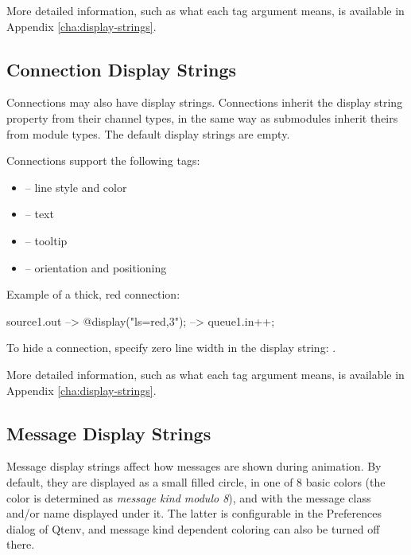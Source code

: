 More detailed information, such as what each tag argument means, is
available in Appendix \ref{cha:display-strings}.


\subsection{Connection Display Strings}
\label{sec:graphics:connection-displaystrings}

Connections may also have display strings. Connections inherit the
display string property from their channel types, in the same way as
submodules inherit theirs from module types. The default display
strings are empty.

Connections support the following tags:

\begin{itemize}
  \item {} -- line style and color
  \item {} -- text
  \item {} -- tooltip
  \item {} -- orientation and positioning
\end{itemize}

Example of a thick, red connection:
\begin{ned}
source1.out --> { @display("ls=red,3"); } --> queue1.in++;
\end{ned}

\begin{center}
\end{center}

\begin{note}
To hide a connection, specify zero line width in the display string:
.
\end{note}

More detailed information, such as what each tag argument means, is
available in Appendix \ref{cha:display-strings}.


\subsection{Message Display Strings}
\label{sec:graphics:message-displaystrings}

Message display strings affect how messages are shown during animation.
By default, they are displayed as a small filled circle, in one of
8 basic colors (the color is determined as \textit{message kind modulo 8}),
and with the message class and/or name displayed under it.
The latter is configurable in the Preferences dialog of Qtenv,
and message kind dependent coloring can also be turned off there.

